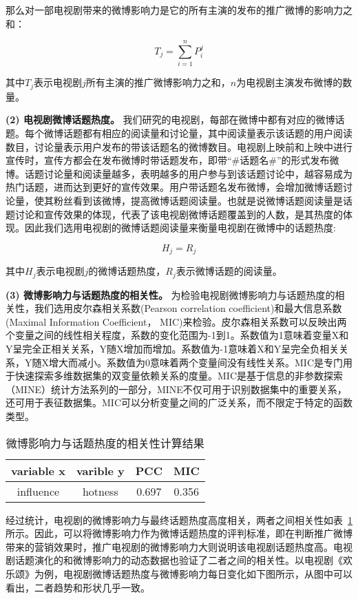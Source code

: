 那么对一部电视剧带来的微博影响力是它的所有主演的发布的推广微博的影响力之和：

\begin{equation}T_j = \sum_{i=1}^n P_i^j\end{equation}

其中$T_j$表示电视剧$j$所有主演的推广微博影响力之和，$n$为电视剧主演发布微博的数量。

\textbf{(2) 电视剧微博话题热度。}
我们研究的电视剧，每部在微博中都有对应的微博话题。每个微博话题都有相应的阅读量和讨论量，其中阅读量表示该话题的用户阅读数目，讨论量表示用户发布的带该话题名的微博数目。电视剧上映前和上映中进行宣传时，宣传方都会在发布微博时带话题发布，即带“\#话题名\#”的形式发布微博。话题讨论量和阅读量越多，表明越多的用户参与到该话题讨论中，越容易成为热门话题，进而达到更好的宣传效果。用户带话题名发布微博，会增加微博话题讨论量，使其粉丝看到该微博，提高微博话题阅读量。也就是说微博话题阅读量是话题讨论和宣传效果的体现，代表了该电视剧微博话题覆盖到的人数，是其热度的体现。因此我们选用电视剧的微博话题阅读量来衡量电视剧在微博中的话题热度:

\begin{equation}H_j = R_j\end{equation}

其中$H_j$表示电视剧$j$的微博话题热度，$R_j$表示微博话题的阅读量。

\textbf{(3) 微博影响力与话题热度的相关性。}
为检验电视剧微博影响力与话题热度的相关性，我们选用皮尔森相关系数(Pearson correlation coefficient)和最大信息系数(Maximal Information Coefficient， MIC)来检验。皮尔森相关系数可以反映出两个变量之间的线性相关程度，系数的变化范围为-1到1。系数值为1意味着变量X和Y呈完全正相关关系，Y随X增加而增加。系数值为-1意味着X和Y呈完全负相关关系，Y随X增大而减小。系数值为0意味着两个变量间没有线性关系。MIC是专门用于快速探索多维数据集的双变量依赖关系的度量。MIC是基于信息的非参数探索（MINE）统计方法系列的一部分，MINE不仅可用于识别数据集中的重要关系，还可用于表征数据集。MIC可以分析变量之间的广泛关系，而不限定于特定的函数类型\cite{10}。

\begin{table}[h]
\centering
\caption{微博影响力与话题热度的相关性计算结果}
\label{rel}
\begin{tabular}{|c|c|c|c|} \hline
variable x&varible y&PCC&MIC\\ \hline
influence&hotness&0.697&0.356\\
\hline\end{tabular}
\end{table}

经过统计，电视剧的微博影响力与最终话题热度高度相关，两者之间相关性如表~\ref{rel}所示。因此，可以将微博影响力作为微博话题热度的评判标准，即在判断推广微博带来的营销效果时，推广电视剧的微博影响力大则说明该电视剧话题热度高。电视剧话题演化的和微博影响力的动态数据也验证了二者之间的相关性。以电视剧《欢乐颂》为例，电视剧微博话题热度与微博影响力每日变化如下图所示，从图中可以看出，二者趋势和形状几乎一致。

